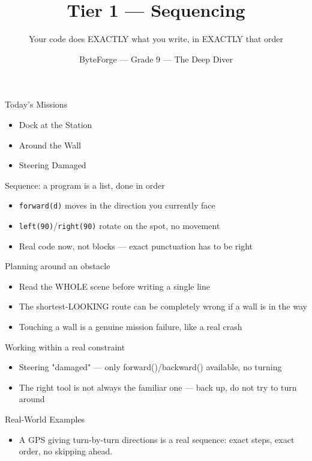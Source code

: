 \documentclass[aspectratio=169]{beamer}
\title{Tier 1 — Sequencing}
\subtitle{Your code does EXACTLY what you write, in EXACTLY that order}
\author{ByteForge --- Grade 9 --- The Deep Diver}
\date{}
\begin{document}
\begin{frame}
    \titlepage
\end{frame}

\begin{frame}{Today's Missions}
    \Large
    \begin{itemize}
        \item Dock at the Station
        \item Around the Wall
        \item Steering Damaged
    \end{itemize}
\end{frame}

\begin{frame}{Sequence: a program is a list, done in order}
    \large
    \begin{itemize}
        \item \texttt{forward(d)} moves in the direction you currently face
        \item \texttt{left(90)}/\texttt{right(90)} rotate on the spot, no movement
        \item Real code now, not blocks --- exact punctuation has to be right
    \end{itemize}
\end{frame}


\begin{frame}{Planning around an obstacle}
    \large
    \begin{itemize}
        \item Read the WHOLE scene before writing a single line
        \item The shortest-LOOKING route can be completely wrong if a wall is in the way
        \item Touching a wall is a genuine mission failure, like a real crash
    \end{itemize}
\end{frame}


\begin{frame}{Working within a real constraint}
    \large
    \begin{itemize}
        \item Steering "damaged" --- only forward()/backward() available, no turning
        \item The right tool is not always the familiar one --- back up, do not try to turn around
    \end{itemize}
\end{frame}

\begin{frame}{Real-World Examples}
    \large
    \begin{itemize}
        \item A GPS giving turn-by-turn directions is a real sequence: exact steps, exact order, no skipping ahead.
    \end{itemize}
\end{frame}
\end{document}
